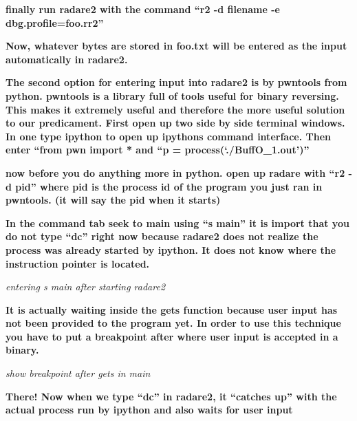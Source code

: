 \textbf{finally run radare2 with the command ``r2 -d filename -e dbg.profile=foo.rr2''}

\textbf{Now, whatever bytes are stored in foo.txt will be entered as the input automatically in radare2.}

  
 \textbf{ }

\textbf{The second option for entering input into radare2 is by pwntools from python. pwntools is a library full of
tools useful for binary reversing. This makes it extremely useful and therefore the more useful solution to our
predicament.\newline
First open up two side by side terminal windows. In one type ipython to open up ipythons command interface. Then enter
``from pwn import *{\textquotedbl} and ``p = process(`./BuffO\_1.out')''}

  
 

\textbf{now before you do anything more in python. open up radare with ``r2 -d pid'' where pid is the process id of the
program you just ran in pwntools. (it will say the pid when it starts)}

  
 

\textbf{In the command tab seek to main using ``s main'' it is import that you do not type ``dc'' right now because
radare2 does not realize the process was already started by ipython. It does not know where the instruction pointer is
located.}

  
 

\textit{entering s main after starting radare2}

\textbf{It is actually waiting inside the gets function because user input has not been provided to the program yet. In
order to use this technique you have to put a breakpoint after where user input is accepted in a binary.}

  
 

\textit{show breakpoint after gets in main}

\textbf{There! Now when we type ``dc'' in radare2, it ``catches up'' with the actual process run by ipython and also
waits for user input}

